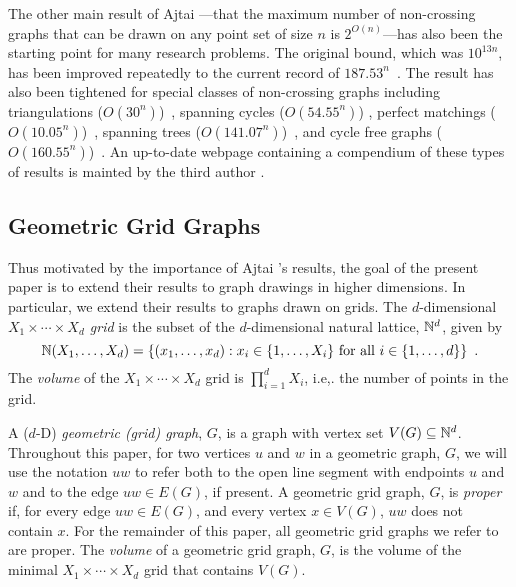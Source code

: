 \documentclass{patmorin}
\begin{document}
The other main result of Ajtai \etal---that the maximum number
of non-crossing graphs that can be drawn on any point set of
size $n$ is $2^{O(n)}$---has also been the starting point
for many research problems. The original bound, which was
$10^{13n}$, has been improved repeatedly to the current record of
$187.53^n$~\cite{sharir.sheffer:counting*1}.  The result has also
been tightened for special classes of non-crossing graphs including
triangulations ($O(30^n)$)~\cite{sharir.sheffer:counting}, spanning
cycles ($O(54.55^n)$) \cite{sharir.sheffer.ea:counting}, perfect
matchings ($O(10.05^n)$)~\cite{sharir.welzl:on}, spanning trees
($O(141.07^n)$)~\cite{hoffmann.sharir.ea:counting}, and cycle free graphs
($O(160.55^n)$)~\cite{hoffmann.sharir.ea:counting,sharir.sheffer:counting}.
An up-to-date webpage containing a compendium of these types of results
is mainted by the third author \cite{sheffer:numbers}.

\subsection{Geometric Grid Graphs}

Thus motivated by the importance of Ajtai \etal's results, the goal of
the present paper is to extend their results to graph drawings in higher
dimensions.  In particular, we extend their results to graphs drawn
on grids.  The $d$-dimensional \emph{$X_1\times\cdots\times X_d$ grid}
is the subset of the $d$-dimensional natural lattice, $\mathbb{N}^d$, given by
\[  \mathbb{N}(X_1,\ldots,X_d) = \{(x_1,\ldots,x_d): 
      \mbox{$x_i\in\{1,\ldots,X_i\}$ for all $i\in\{1,\ldots,d\}$}\}
	\enspace .\]
The \emph{volume} of the $X_1\times\cdots\times X_d$ grid is
$\prod_{i=1}^d X_i$, i.e,. the number of points in the grid.

A ($d$-D) \emph{geometric (grid) graph}, $G$, is a graph with vertex set
$V(G)\subseteq \mathbb{N}^d$.  Throughout this paper, for two vertices $u$ and $w$
in a geometric graph, $G$, we will use the notation $uw$ to refer both to
the open line segment with endpoints $u$ and $w$ and to the edge $uw\in
E(G)$, if present.  A geometric grid graph, $G$, is \emph{proper} if,
for every edge $uw\in E(G)$, and every vertex $x\in V(G)$, $uw$ does
not contain $x$.  For the remainder of this paper, all geometric grid
graphs we refer to are proper.  The \emph{volume} of a geometric grid
graph, $G$, is the volume of the minimal $X_1\times\cdots\times X_d$
grid that contains $V(G)$.
\end{document}
